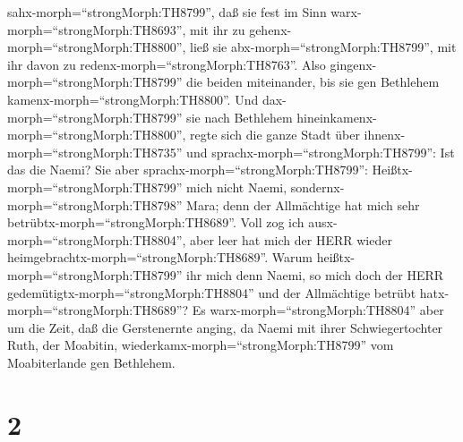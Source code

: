 sahx-morph=``strongMorph:TH8799'', daß sie fest im Sinn
warx-morph=``strongMorph:TH8693'', mit ihr zu
gehenx-morph=``strongMorph:TH8800'', ließ sie
abx-morph=``strongMorph:TH8799'', mit ihr davon zu
redenx-morph=``strongMorph:TH8763''.  Also
gingenx-morph=``strongMorph:TH8799'' die beiden miteinander, bis sie gen
Bethlehem kamenx-morph=``strongMorph:TH8800''. Und
dax-morph=``strongMorph:TH8799'' sie nach Bethlehem
hineinkamenx-morph=``strongMorph:TH8800'', regte sich die ganze Stadt
über ihnenx-morph=``strongMorph:TH8735'' und
sprachx-morph=``strongMorph:TH8799'': Ist das die Naemi? 
Sie aber sprachx-morph=``strongMorph:TH8799'':
Heißtx-morph=``strongMorph:TH8799'' mich nicht Naemi,
sondernx-morph=``strongMorph:TH8798'' Mara; denn der Allmächtige hat
mich sehr betrübtx-morph=``strongMorph:TH8689''.  Voll zog
ich ausx-morph=``strongMorph:TH8804'', aber leer hat mich der HERR
wieder heimgebrachtx-morph=``strongMorph:TH8689''. Warum
heißtx-morph=``strongMorph:TH8799'' ihr mich denn Naemi, so mich doch
der HERR gedemütigtx-morph=``strongMorph:TH8804'' und der Allmächtige
betrübt hatx-morph=``strongMorph:TH8689''?  Es
warx-morph=``strongMorph:TH8804'' aber um die Zeit, daß die Gerstenernte
anging, da Naemi mit ihrer Schwiegertochter Ruth, der Moabitin,
wiederkamx-morph=``strongMorph:TH8799'' vom Moabiterlande gen Bethlehem.

\hypertarget{section-1}{%
\section{2}\label{section-1}}

